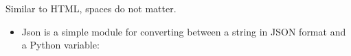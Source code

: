 \documentclass[letterpaper,10pt,english]{sphinxmanual}
\begin{document}
\begin{itemize}
\begin{sphinxVerbatim}[commandchars=\\\{\}]
\end{sphinxVerbatim}

Similar to HTML, spaces do not matter.
\begin{itemize}
\item {} 
Json is a simple module for converting between a string in
JSON format and a Python variable:

\begin{sphinxVerbatim}[commandchars=\\\{\}]
 
  \PYG{l+s+s1}{ [ }\PYG{l+s+s1}{, [ }\PYG{l+s+s1}{, 3 ] ] }
\end{sphinxVerbatim}

\end{itemize}

\end{itemize}
\end{document}
